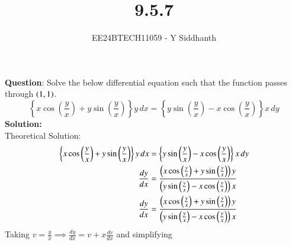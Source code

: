 \documentclass[journal]{IEEEtran}
\begin{document}
	
	
	\vspace{3cm}
	
	\title{9.5.7}
	\author{EE24BTECH11059 - Y Siddhanth}
	{\let\newpage\relax\maketitle}
	
	\renewcommand{\thefigure}{\theenumi}
	\renewcommand{\thetable}{\theenumi}
	\setlength{\intextsep}{10pt} %
	
	
	\renewcommand{\thetable}{\theenumi}
	
	
	\textbf{Question}:\newline
	Solve the below differential equation such that the function passes through $\left(1,1\right)$.\[
	\left\{ x \cos\left(\frac{y}{x}\right) + y \sin\left(\frac{y}{x}\right) \right\} y \, dx = 
	\left\{ y \sin\left(\frac{y}{x}\right) - x \cos\left(\frac{y}{x}\right) \right\} x \, dy
	\]
	\textbf{Solution: }\\
	Theoretical Solution:
	\begin{align}
		\left\{ x \cos\left(\frac{y}{x}\right) + y \sin\left(\frac{y}{x}\right) \right\} y \, dx &= 
		\left\{ y \sin\left(\frac{y}{x}\right) - x \cos\left(\frac{y}{x}\right) \right\} x \, dy \\ 
		\frac{dy}{dx} &= \frac{ \left(x \cos\left(\frac{y}{x}\right) + y \sin\left(\frac{y}{x}\right) \right)y}{\left(y \sin\left(\frac{y}{x}\right) - x \cos\left(\frac{y}{x}\right) \right)x} \\
		\frac{dy}{dx} &= \frac{ \left(x \cos\left(\frac{y}{x}\right) + y \sin\left(\frac{y}{x}\right) \right)y}{\left(y \sin\left(\frac{y}{x}\right) - x \cos\left(\frac{y}{x}\right) \right)x}
	\end{align}
	Taking $v = \frac{y}{x} \implies \frac{dy}{dx} = v + x\frac{dv}{dx}$ and simplifying
	
\end{document}
